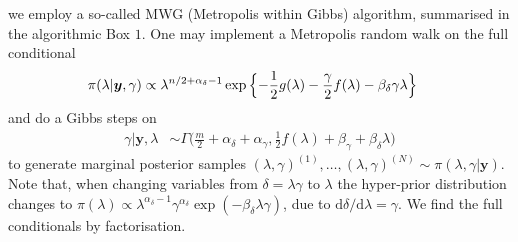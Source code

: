 we employ a so-called MWG (Metropolis within Gibbs) algorithm, summarised in the algorithmic Box $1$.
One may implement a Metropolis random walk on the full conditional
\begin{align}
	\label{eq:lamCondPrior}
	\pi(\lambda | \bm{y}, \gamma) &\propto \lambda^{n/2+\alpha_\delta -1} \exp{\Bigl\{ - \frac{1}{2} g ( \lambda) - \frac{\gamma}{2} f ( \lambda) - \beta_\delta \gamma \lambda \Bigr\}} 
\end{align} 
and do a Gibbs steps on
\begin{align}
	\gamma |  \bm{y}, \lambda &\sim \Gamma \bigg( \frac{m}{2} + \alpha_\delta + \alpha_\gamma, \frac{1}{2} f (\lambda ) + \beta_\gamma + \beta_\delta \lambda \bigg)\label{eq:gamCondPrior}
\end{align} 
to generate marginal posterior samples $(\lambda, \gamma)^{(1)}, \dots, (\lambda, \gamma)^{(N)} \sim  \pi(\lambda, \gamma| \bm{y})$.
Note that, when changing variables from $\delta = \lambda \gamma$ to $\lambda$ the hyper-prior distribution changes to $\pi(\lambda) \propto \lambda^{\alpha_\delta-1} \gamma^{\alpha_\delta} \exp{(- \beta_\delta \lambda  \gamma)} $, due to $\text{d}\delta / \text{d} \lambda = \gamma$.
We find the full conditionals by factorisation.



